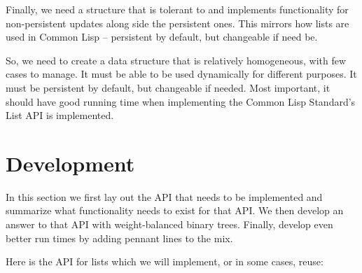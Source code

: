\documentclass[sigconf]{acmart}
\begin{document}
Finally, we need a structure that is tolerant to and implements functionality
for non-persistent updates along side the persistent ones. This mirrors how
lists are used in Common Lisp -- persistent by default, but changeable if need
be.

So, we need to create a data structure that is relatively homogeneous, with
few cases to manage. It must be able to be used dynamically for different
purposes. It must be persistent by default, but changeable if needed. Most
important, it should have good running time when implementing the Common Lisp
Standard's List API is implemented.

\section{Development}

In this section we first lay out the API that needs to be implemented and summarize
what functionality needs to exist for that API. We then develop an answer to
that API with weight-balanced binary trees. Finally, develop even better run
times by adding pennant lines to the mix.

Here is the API for lists which we will implement, or in some cases, reuse:
\end{document}

